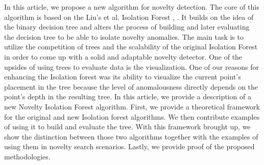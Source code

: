 In this article, we propose a new algorithm for novelty detection.
The core of this algorithm is based on the Liu's et al. Isolation Forest \cite{liu2008isolation}, \cite{liu2012isolation}.
It builds on the idea of the binary decision tree and alters the process of building and later evaluating the decision tree to be able to isolate novelty anomalies.
The main task is to utilize the competition of trees and the scalability of the original Isolation Forest in order to come up with a solid and adaptable novelty detector. One of the upsides of using trees to evaluate data is the visualization. One of our reasons for enhancing the Isolation forest was its ability to visualize the current point's placement in the tree because the level of anomalousness directly depends on the point's depth in the resulting tree.
In this article, we provide a description of a new Novelty Isolation Forest algorithm.
First, we provide a theoretical framework for the original and new Isolation forest algorithms.
We then contribute examples of using it to build and evaluate the tree.
With this framework brought up, we show the distinction between those two algorithms together with the examples of using them in novelty search scenarios.
Lastly, we provide proof of the proposed methodologies.


